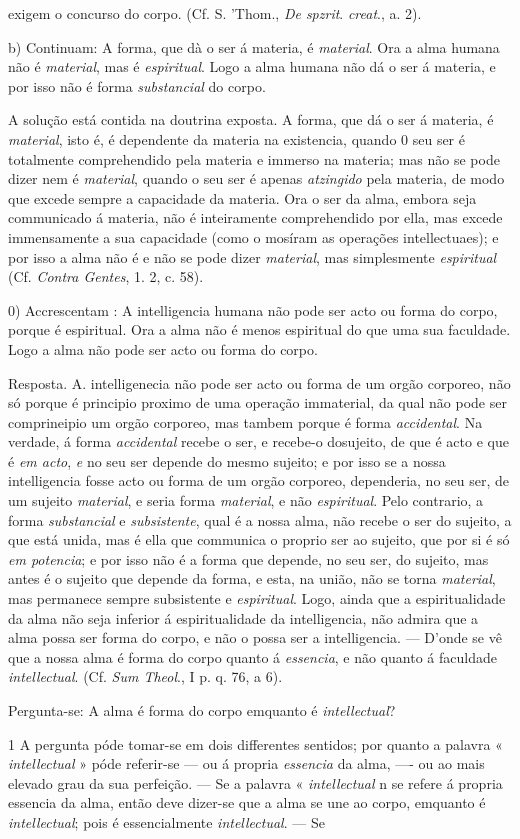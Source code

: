 exigem o concurso do corpo. (Cf. S. 'Thom., \emph{De spzrit}. \emph{creat}., a. 2).\par b) Continuam: A forma, que dà o ser á materia, é \emph{material}. Ora a alma humana não é \emph{material}, mas é \emph{espiritual}. Logo a alma humana não dá o ser á materia, e por isso não é forma \emph{substancial} do corpo.\par A solução está contida na doutrina exposta. A forma, que dá o ser á materia, é \emph{material}, isto é, é dependente da materia na existencia, quando 0 seu ser é totalmente comprehendido pela materia e immerso na materia; mas não se pode dizer nem é \emph{material}, quando o seu ser é apenas \emph{atzingido} pela materia, de modo que excede sempre a capacidade da materia. Ora o ser da alma, embora seja communicado á materia, não é inteiramente comprehendido por ella, mas excede immensamente a sua capacidade (como o mosíram as operações intellectuaes); e por isso a alma não é e não se pode dizer \emph{material}, mas simplesmente \emph{espiritual} (Cf. \emph{Contra Gentes}, 1. 2, c. 58).\par 0) Accrescentam : A intelligencia humana não pode ser acto ou forma do corpo, porque é espiritual. Ora a alma não é menos espiritual do que uma sua faculdade. Logo a alma não pode ser acto ou forma do corpo.\par Resposta. A. intelligenecia não pode ser acto ou forma de um orgão corporeo, não só porque é principio proximo de uma operação immaterial, da qual não pode ser comprineipio um orgão corporeo, mas tambem porque é forma \emph{accidental}. Na verdade, á forma \emph{accidental} recebe o ser, e recebe-o dosujeito, de que é acto e que é \emph{em acto}, \emph{e} no seu ser depende do mesmo sujeito; e por isso se a nossa intelligencia fosse acto ou forma de um orgão corporeo, dependeria, no seu ser, de um sujeito \emph{material}, e seria forma \emph{material}, e não \emph{espiritual}. Pelo contrario, a forma \emph{substancial} e \emph{subsistente}, qual é a nossa alma, não recebe o ser do sujeito, a que está unida, mas é ella que communica o proprio ser ao sujeito, que por si é só \emph{em potencia}; e por isso não é a forma que depende, no seu ser, do sujeito, mas antes é o sujeito que depende da forma, e esta, na união, não se torna \emph{material}, mas permanece sempre subsistente e \emph{espiritual}. Logo, ainda que a espiritualidade da alma não seja inferior á espiritualidade da intelligencia, não admira que a alma possa ser forma do corpo, e não o possa ser a intelligencia. --- D'onde se vê que a nossa alma é forma do corpo quanto á \emph{essencia}, e não quanto á faculdade \emph{intellectual}. (Cf. \emph{Sum Theol}., I p. q. 76, a 6).\par Pergunta-se: A alma é forma do corpo emquanto é \emph{intellectual}?\par 1 A pergunta póde tomar-se em dois differentes sentidos; por quanto a palavra « \emph{intellectual} » póde referir-se --- ou á propria \emph{essencia} da alma, ---- ou ao mais elevado grau da sua perfeição. --- Se a palavra « \emph{intellectual} n se refere á propria essencia da alma, então deve dizer-se que a alma se une ao corpo, emquanto é \emph{intellectual}; pois é essencialmente \emph{intellectual}. --- Se 